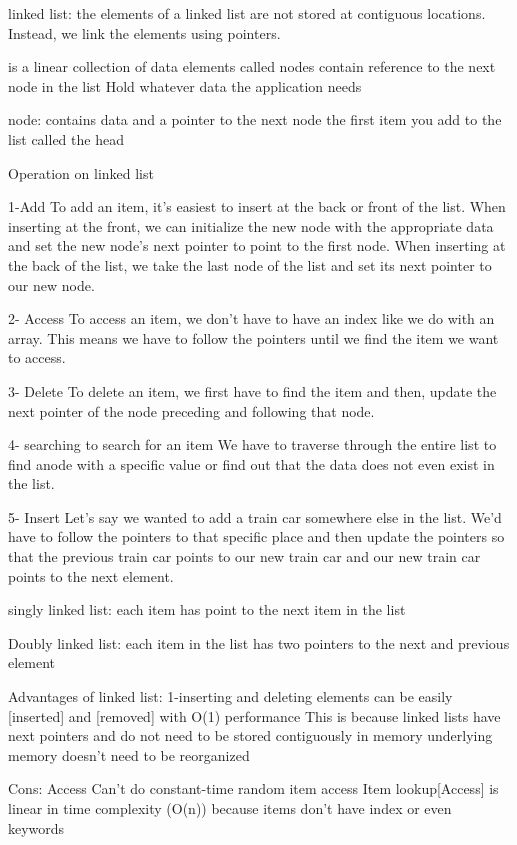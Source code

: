 linked list:
  the elements of a linked list are not stored at contiguous locations. 
  Instead, we link the elements using pointers.
  
  is a linear collection of data elements  called nodes
  contain reference to the next node in the list
  Hold whatever data the application needs

  node: 
    contains data and a pointer to the next node
    the first item you add to the list called the head

  Operation on linked list
    
    1-Add
      To add an item, it's easiest to insert at the back or front of the list.
      When inserting at the front, we can initialize the new node with the appropriate data and set the new node's next pointer to point to the first node.
      When inserting at the back of the list, we take the last node of the list and set its next pointer to our new node.

    2- Access 
      To access an item, we don't have to have an index like we do with an array.
      This means we have to follow the pointers until we find the item we want to access.

    3- Delete
      To delete an item, we first have to find the item and then,
      update the next pointer of the node preceding and following that node.

    4- searching 
    to search for an item We have to traverse through the entire list to find anode with a specific value 
    or find out that the data does not even exist in the list.

    5- Insert 
    Let's say we wanted to add a train car somewhere else in the list.
    We'd have to follow the pointers to that specific place and then update the pointers 
    so that the previous train car points to our new train car and our new train car points to the next element.


  singly linked list:
    each item has point to the next item in the list 

  Doubly linked list:
    each item in the list has two pointers to the next and previous element 
  
  Advantages of linked list:
    1-inserting and deleting 
      elements can be easily [inserted] and [removed] with O(1) performance 
      This is because linked lists have next pointers and do not need to be stored contiguously in memory
      underlying memory doesn't need to be reorganized 
    
  Cons:
    Access
      Can't do constant-time random item access
      Item lookup[Access] is linear in time complexity (O(n))
      because items don't have index or even keywords

